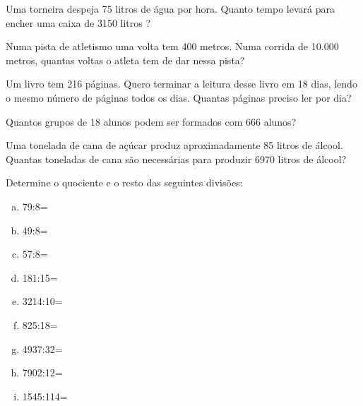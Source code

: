 \item Uma torneira despeja 75 litros de água por hora. Quanto tempo levará para encher uma caixa de 3150 litros ?

\item Numa pista de atletismo uma volta tem 400 metros. Numa corrida de 10.000 metros, quantas voltas o atleta tem de dar nessa pista?

\item Um livro tem 216 páginas. Quero terminar a leitura desse livro em 18 dias, lendo o mesmo número de páginas todos os dias. Quantas páginas preciso ler por dia?

\item Quantos grupos de 18 alunos podem ser formados com 666 alunos?

\item Uma tonelada de cana de açúcar produz aproximadamente 85 litros de álcool. Quantas toneladas de cana são necessárias para produzir 6970 litros de álcool?

\item Determine o quociente e o resto das seguintes divisões:
\begin{multicols}{3}
\begin{enumerate}[a)]
	\item 79:8= 
	\item 49:8= 
	\item 57:8= 
	\item 181:15= 
	\item 3214:10= 
	\item 825:18= 
	\item 4937:32= 
	\item 7902:12=
	\item 1545:114=
\end{enumerate}
\end{multicols}



